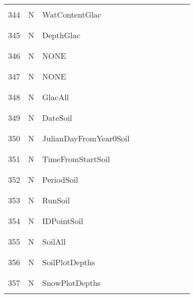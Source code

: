 \begin{longtable}{|c|c|l|c|c|c|c|p{}|c|p{}|}
&&&&&&&&&\\
344 & N & WatContentGlac & & & & & & & \\
&&&&&&&&&\\\hline%
&&&&&&&&&\\
345 & N & DepthGlac & & & & & & & \\
&&&&&&&&&\\\hline%
&&&&&&&&&\\
346 & N & NONE & & & & & & & \\
&&&&&&&&&\\\hline%
&&&&&&&&&\\
347 & N & NONE & & & & & & & \\
&&&&&&&&&\\\hline%
&&&&&&&&&\\
348 & N & GlacAll & & & & & & & \\
&&&&&&&&&\\\hline%
&&&&&&&&&\\
349 & N & DateSoil & & & & & & & \\
&&&&&&&&&\\\hline%
&&&&&&&&&\\
350 & N & JulianDayFromYear0Soil & & & & & & & \\
&&&&&&&&&\\\hline%
&&&&&&&&&\\
351 & N & TimeFromStartSoil & & & & & & & \\
&&&&&&&&&\\\hline%
&&&&&&&&&\\
352 & N & PeriodSoil & & & & & & & \\
&&&&&&&&&\\\hline%
&&&&&&&&&\\
353 & N & RunSoil & & & & & & & \\
&&&&&&&&&\\\hline%
&&&&&&&&&\\
354 & N & IDPointSoil & & & & & & & \\
&&&&&&&&&\\\hline%
&&&&&&&&&\\
355 & N & SoilAll & & & & & & & \\
&&&&&&&&&\\\hline%
&&&&&&&&&\\
356 & N & SoilPlotDepths & & & & & & & \\
&&&&&&&&&\\\hline%
&&&&&&&&&\\
357 & N & SnowPlotDepths & & & & & & & \\
&&&&&&&&&\\\hline%

\end{longtable}
